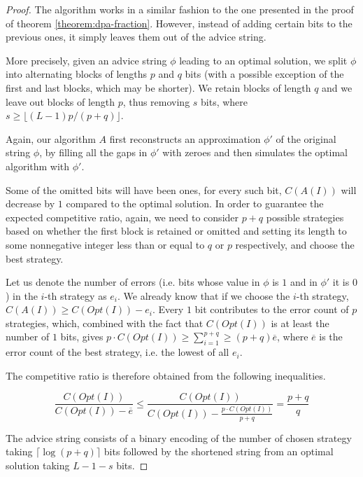 \begin{proof}
    The algorithm works in a similar fashion to the one presented in the
    proof of theorem \ref{theorem:dpa-fraction}. However, instead of
    adding certain bits to the previous ones, it simply leaves them out of
    the advice string.

    More precisely, given an advice string $\phi$ leading to an optimal
    solution, we split $\phi$ into alternating blocks of lengths $p$ and
    $q$ bits (with a possible exception of the first and last blocks,
    which may be shorter). We retain blocks of length $q$ and we leave out
    blocks of length $p$, thus removing $s$ bits, where $s \geq
    \lfloor(L-1) p / (p+q)\rfloor$.

    Again, our algorithm $A$ first reconstructs an approximation
    $\phi'$ of the original string $\phi$, by filling all the gaps in
    $\phi'$ with zeroes and then simulates the optimal algorithm with
    $\phi'$.

    Some of the omitted bits will have been ones, for every such bit,
    $C(A(I))$ will decrease by $1$ compared to the optimal solution. In
    order to guarantee the expected competitive ratio, again, we need to
    consider $p+q$ possible strategies based on whether the first block is
    retained or omitted and setting its length to some nonnegative integer
    less than or equal to $q$ or $p$ respectively, and choose the best
    strategy.

    Let us denote the number of errors (i.e. bits whose value in $\phi$ is
    $1$ and in $\phi'$ it is $0$) in the $i$-th strategy as $e_i$. We
    already know that if we choose the $i$-th strategy, $C(A(I)) \geq
    C(Opt(I)) - e_i$. Every $1$ bit contributes to the error count of $p$
    strategies, which, combined with the fact that $C(Opt(I))$ is at least
    the number of $1$ bits, gives $p \cdot C(Opt(I)) \geq \sum_{i=1}^{p+q}
    \geq (p+q) \overline{e}$, where $\overline{e}$ is the error count of
    the best strategy, i.e. the lowest of all $e_i$.

    The competitive ratio is therefore obtained from the following
    inequalities.

    $$
        \frac{C(Opt(I))}{C(Opt(I))-\overline{e}} \leq
        \frac{C(Opt(I))}{C(Opt(I)) - \frac{p\cdot{}C(Opt(I))}{p+q}} =
        \frac{p+q}{q}
    $$

    The advice string consists of a binary encoding of the number of
    chosen strategy taking $\lceil\log(p+q)\rceil$ bits followed by the
    shortened string from an optimal solution taking $L - 1 - s$ bits.
\end{proof}

